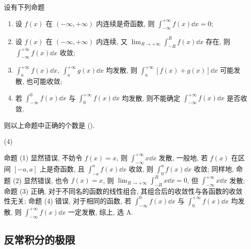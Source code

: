 \begin{example}
    设有下列命题
    \begin{enumerate}[label=(\arabic{*})]
        \item 设 $ f(x) $ 在 $ (-\infty,+\infty) $ 内连续是奇函数, 则 $\displaystyle  \int_{-\infty}^{+\infty} f(x) \dd x=0 $;
        \item 设 $ f(x) $ 在 $ (-\infty,+\infty) $ 内连续, 又 $\displaystyle \lim _{R \to+\infty} \int_{-R}^{R} f(x) \dd x $ 存在, 则 $\displaystyle \int_{-\infty}^{+\infty} f(x) \dd x $ 收敛;
        \item $\displaystyle \int_{a}^{+\infty} f(x) \dd x,~ \int_{a}^{+\infty} g(x) \dd x $ 均发散, 则 $\displaystyle  \int_{a}^{+\infty}[f(x)+g(x)] \dd x $ 可能发散, 也可能收敛;
        \item 若 $ \displaystyle \int_{-\infty}^{0} f(x) \dd x $ 与 $\displaystyle  \int_{0}^{+\infty} f(x) \dd x $ 均发散, 则不能确定 $\displaystyle \int_{-\infty}^{+\infty} f(x) \dd x $ 是否收敛.
    \end{enumerate}
    则以上命题中正确的个数是 (\quad).
    \begin{tasks}(4)
    \end{tasks}
\end{example}
\begin{solution}
    命题 (1) 显然错误, 不妨令 $f(x)=x$, 则 $\displaystyle\int_{-\infty}^{+\infty}x\dd x$ 发散, 一般地, 若 $f(x)$ 在区间 $[-a,a]$ 上是奇函数, 且 $\displaystyle\int_{-a}^{a}f(x)\dd x$ 收敛, 则 $\displaystyle\int_{0}^{a}f(x)\dd x$ 收敛;
    同样地, 命题 (2) 显然错误, 也令 $f(x)=x$, 则 $\displaystyle\lim_{R\to+\infty}\int_{-R}^{R}x\dd x=0$, 但 $\displaystyle\int_{-\infty}^{+\infty}x\dd x$ 发散;
    命题 (3) 正确, 对于不同名的函数的线性组合, 其组合后的收敛性与各函数的收敛性无关; 命题 (4) 错误, 对于相同的函数, 若 $ \displaystyle \int_{-\infty}^{0} f(x) \dd x $ 与 $\displaystyle  \int_{0}^{+\infty} f(x) \dd x $ 均发散,
    则 $\displaystyle \int_{-\infty}^{+\infty} f(x) \dd x $ 一定发散, 综上, 选 A.
\end{solution}

\subsection{反常积分的极限}

